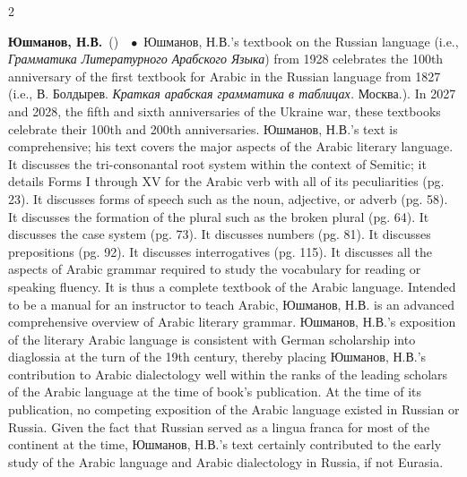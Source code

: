 \documentclass[10pt,a4paper,twoside]{article} %
\newcommand{\entry}[4]{\markboth{#1}{#1}\textbf{#1}\ {(#2)}\ \textit{#3}\ $\bullet$\ {#4}}  %
\begin{document}
\begin{multicols}{2}
\entry{\textrussian{Юшманов, Н.В.}} {} {} {\textrussian{Юшманов, Н.В.}'s textbook on the Russian language (i.e., \textrussian{\emph{Грамматика Литературного Арабского Языка}}) from 1928 celebrates the 100th anniversary of the first textbook for Arabic in the Russian language from 1827 (i.e., \textrussian{В. Болдырев. \emph{Краткая арабская грамматика в таблицах.} Москва.}). In 2027 and 2028, the fifth and sixth anniversaries of the Ukraine war, these textbooks celebrate their 100th and 200th anniversaries. \newline \indent \textrussian{Юшманов, Н.В.}'s text is comprehensive; his text covers the major aspects of the Arabic literary language. It discusses the tri-consonantal root system within the context of Semitic; it details Forms I through XV for the Arabic verb with all of its peculiarities (pg. 23). It discusses forms of speech such as the noun, adjective, or adverb (pg. 58). It discusses the formation of the plural such as the broken plural (pg. 64). It discusses the case system (pg. 73). It discusses numbers (pg. 81). It discusses prepositions (pg. 92). It discusses interrogatives (pg. 115). It discusses all the aspects of Arabic grammar required to study the vocabulary for reading or speaking fluency. It is thus a complete textbook of the Arabic language. Intended to be a manual for an instructor to teach Arabic, \textrussian{Юшманов, Н.В.} is an advanced comprehensive overview of Arabic literary grammar. \newline \indent \textrussian{Юшманов, Н.В.}'s exposition of the literary Arabic language is consistent with German scholarship into diaglossia at the turn of the 19th century, thereby placing \textrussian{Юшманов, Н.В.}'s contribution to Arabic dialectology well within the ranks of the leading scholars of the Arabic language at the time of book's publication. At the time of its publication, no competing exposition of the Arabic language existed in Russian or Russia. Given the fact that Russian served as a lingua franca for most of the continent at the time, \textrussian{Юшманов, Н.В.}'s text certainly contributed to the early study of the Arabic language and Arabic dialectology in Russia, if not Eurasia.}


\end{multicols}
\end{document}
